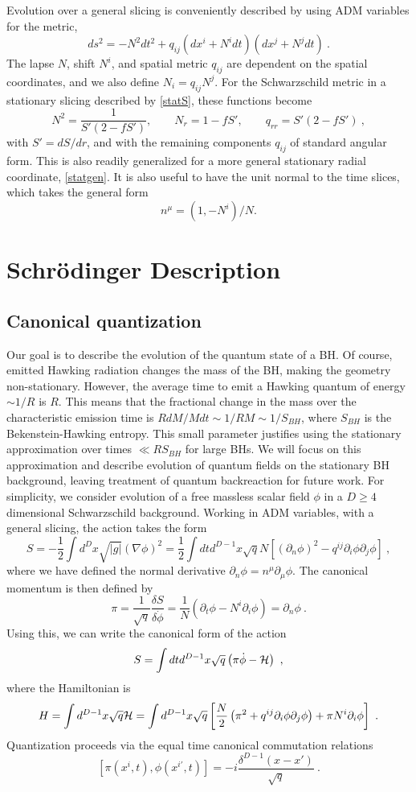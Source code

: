 \documentclass[12pt]{article}
\numberwithin{equation}{section}
\newcommand{\calh}{{\cal H}}
\newcommand{\beq}{\begin{equation}}
\newcommand{\eeq}{\end{equation}}
\newcommand{\hf}{\frac{1}{2}}
\begin{document}
Evolution over a general  slicing is conveniently described by using ADM variables\cite{ADM} for the metric,
\beq
\label{ADMmet}
ds^2 = -N^2 dt^2 +q_{ij}(dx^i + N^i dt)(dx^j + N^j dt)\ .
\eeq
The lapse $N$, shift $N^i$, and spatial metric $q_{ij}$ are dependent on the spatial coordinates, and we also define
$N_i =q_{ij} N^j$. For the Schwarzschild metric in a stationary slicing described by \eqref{statS}, these functions become\cite{NVU}
\beq\label{ADMvar}
N^2 = \frac{1}{S'(2-f S')},\quad \quad N_r = 1-f S',\quad\quad q_{rr} = S'(2-f S')\ ,
\eeq
with $S'=dS/dr$, and
with the remaining components $q_{ij}$ of standard angular form.  This is also readily generalized for a more general stationary radial coordinate, 
\eqref{statgen}.
It is also useful to have the unit normal to the time slices, which takes the general form 
\beq\label{normdef}
n^{\mu} = (1,-N^i)/N .
\eeq


\section{Schr\"odinger Description}
\label{Schsec}

\subsection{Canonical quantization}

Our goal is to describe the evolution of the quantum state of a BH.  
Of course, emitted Hawking radiation changes the mass of the BH, making the geometry non-stationary.  However, the average time to emit a Hawking quantum of energy $\sim 1/R$ is $R$.  This means that the fractional change in the mass over the characteristic emission time is $R dM/Mdt\sim 1/RM \sim 1/S_{BH}$, where $S_{BH}$ is the Bekenstein-Hawking entropy.  This small parameter justifies using the stationary approximation over times $\ll R S_{BH}$ for large BHs.  We will focus on this approximation and describe evolution of quantum fields on the stationary BH background, leaving treatment of quantum backreaction for future work.
For simplicity, we consider  evolution of a free massless scalar field $\phi$ in a $D\geq 4$ dimensional Schwarzschild background. Working in ADM variables, with a general slicing, the action takes the form 
\beq\label{Sact}
S=-\hf \int d^D x \sqrt{|g|} (\nabla\phi)^2 =  \frac{1}{2} \int dt d^{D-1}x \sqrt q N \left[ (\partial_n\phi)^2 - q^{ij}\partial_i \phi \partial_j \phi\right]\ ,
\eeq
where we have defined the normal derivative $\partial_n\phi=n^\mu\partial_\mu \phi$.  
The canonical momentum is then defined by
\beq\label{canonmom}
\pi= \frac{1}{\sqrt q}\frac{\delta S}{ \delta \dot\phi} = \frac{1}{N}\left(\partial_t \phi - N^i\partial_i\phi\right) = \partial_n\phi\ .
\eeq
Using this, we can write the canonical form of the action
\beq
S=\int dt d^{D-1}x \sqrt q \left(\pi \dot\phi  - \calh\right)\ ,
\eeq
where the Hamiltonian is
\beq\label{ADMH}
H =  \int d^{D-1} x \sqrt q \calh= \int d^{D-1} x \sqrt q \left[ \frac{N}{2}\left(\pi^2+q^{ij}\partial_i\phi \partial_j\phi\right) + \pi N^i \partial_i\phi \right] \ .
\eeq 
Quantization proceeds via the equal time canonical commutation relations
\beq\label{CCRs}
[\pi(x^i, t), \phi(x^{i\prime}, t)]=-i \frac{\delta^{D-1}(x-x')}{\sqrt{q}}\ .
\eeq
\end{document}

